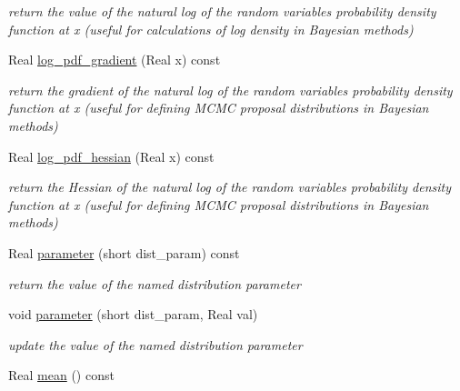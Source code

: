 \begin{DoxyCompactItemize}
\begin{DoxyCompactList}\small\item\em return the value of the natural log of the random variable\textquotesingle{}s probability density function at x (useful for calculations of log density in Bayesian methods) \end{DoxyCompactList}\item 
Real \hyperlink{classPecos_1_1LognormalRandomVariable_a5ccc16c04690f0c501f44c1ffae2bbd1}{log\+\_\+pdf\+\_\+gradient} (Real x) const \label{classPecos_1_1LognormalRandomVariable_a5ccc16c04690f0c501f44c1ffae2bbd1}

\begin{DoxyCompactList}\small\item\em return the gradient of the natural log of the random variable\textquotesingle{}s probability density function at x (useful for defining M\+C\+MC proposal distributions in Bayesian methods) \end{DoxyCompactList}\item 
Real \hyperlink{classPecos_1_1LognormalRandomVariable_a7b43f26f0f2bcdfef15d87e1f9399b33}{log\+\_\+pdf\+\_\+hessian} (Real x) const \label{classPecos_1_1LognormalRandomVariable_a7b43f26f0f2bcdfef15d87e1f9399b33}

\begin{DoxyCompactList}\small\item\em return the Hessian of the natural log of the random variable\textquotesingle{}s probability density function at x (useful for defining M\+C\+MC proposal distributions in Bayesian methods) \end{DoxyCompactList}\item 
Real \hyperlink{classPecos_1_1LognormalRandomVariable_aa891dab1ae9a225f493e3a0e5032b778}{parameter} (short dist\+\_\+param) const \label{classPecos_1_1LognormalRandomVariable_aa891dab1ae9a225f493e3a0e5032b778}

\begin{DoxyCompactList}\small\item\em return the value of the named distribution parameter \end{DoxyCompactList}\item 
void \hyperlink{classPecos_1_1LognormalRandomVariable_ae8e123224f588aee676d5d56d5ca900d}{parameter} (short dist\+\_\+param, Real val)\label{classPecos_1_1LognormalRandomVariable_ae8e123224f588aee676d5d56d5ca900d}

\begin{DoxyCompactList}\small\item\em update the value of the named distribution parameter \end{DoxyCompactList}\item 
Real \hyperlink{classPecos_1_1LognormalRandomVariable_a962ffe5a3593be370d5c883365c060f4}{mean} () const \label{classPecos_1_1LognormalRandomVariable_a962ffe5a3593be370d5c883365c060f4}


\end{DoxyCompactItemize}
